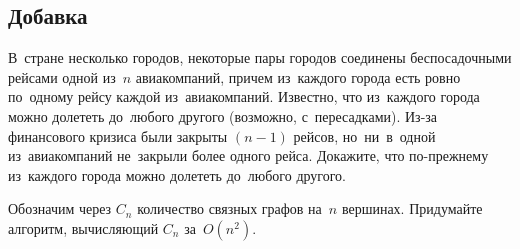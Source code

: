 


\subsection*{Добавка}


\begin{problems}

\item
В~стране несколько городов, некоторые пары городов соединены беспосадочными
рейсами одной из~$n$ авиакомпаний, причем из~каждого города есть ровно
по~одному рейсу каждой из~авиакомпаний.
Известно, что из~каждого города можно долететь до~любого другого (возможно,
с~пересадками).
Из-за финансового кризиса были закрыты $(n - 1)$ рейсов, но~ни~в~одной
из~авиакомпаний не~закрыли более одного рейса.
Докажите, что по-прежнему из~каждого города можно долететь до~любого другого.

\item
Обозначим через $C_n$ количество связных графов на~$n$ вершинах.
Придумайте алгоритм, вычисляющий $C_n$ за~$O(n^2)$.

\end{problems}

